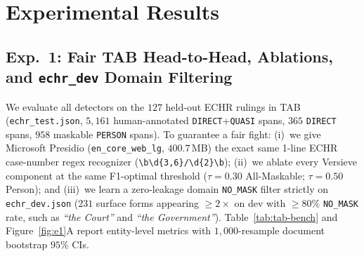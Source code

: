 \documentclass{article}
\begin{document}
\begin{table}[t]
\caption{Benchmarks evaluated, noting real human vs.\ external synthetic vs.\ locally synthesized data provenance.}
\label{tab:datasets}
\vskip 0.08in
\begin{center}
\end{center}
\vskip -0.14in
\end{table}

\section{Experimental Results}
\label{sec:results}

\subsection{Exp.~1: Fair TAB Head-to-Head, Ablations, and \texttt{echr\_dev} Domain Filtering}
\label{sec:exp1}

We evaluate all detectors on the $127$ held-out ECHR rulings in TAB (\texttt{echr\_test.json}, $5{,}161$ human-annotated \texttt{DIRECT}+\texttt{QUASI} spans, $365$ \texttt{DIRECT} spans, $958$ maskable \texttt{PERSON} spans). To guarantee a fair fight: (i)~we give Microsoft Presidio (\texttt{en\_core\_web\_lg}, $400.7$\,MB) the exact same 1-line ECHR case-number regex recognizer (\texttt{\textbackslash b\textbackslash d\{3,6\}/\textbackslash d\{2\}\textbackslash b}); (ii)~we ablate every Versieve component at the same F1-optimal threshold ($\tau{=}0.30$ All-Maskable; $\tau{=}0.50$ Person); and (iii)~we learn a zero-leakage domain \texttt{NO\_MASK} filter strictly on \texttt{echr\_dev.json} ($231$ surface forms appearing $\ge 2\times$ on dev with $\ge 80\%$ \texttt{NO\_MASK} rate, such as \emph{``the Court''} and \emph{``the Government''}). Table~\ref{tab:tab-bench} and Figure~\ref{fig:e1}A report entity-level metrics with $1{,}000$-resample document bootstrap $95\%$ CIs.
\end{document}
